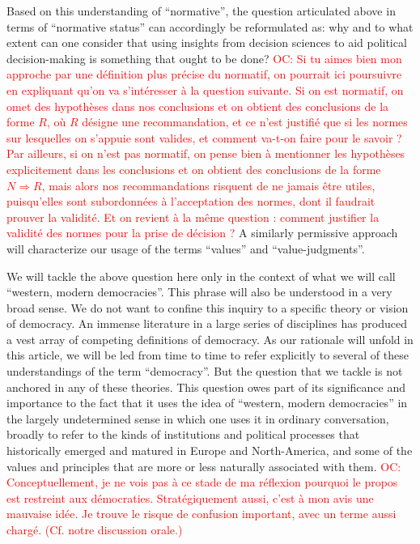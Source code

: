 \documentclass[preprint, french, english, 11pt]{elsarticle}%
\newcommand{\commentOC}[1]{\textcolor{red}{OC: #1}}
\begin{document}
Based on this understanding of ``normative'', the question articulated above in terms of ``normative status'' can accordingly be reformulated as: why and to what extent can one consider that using insights from decision sciences to aid political decision-making is something that ought to be done?
\commentOC{Si tu aimes bien mon approche par une définition plus précise du normatif, on pourrait ici poursuivre en expliquant qu’on va s’intéresser à la question suivante. Si on est normatif, on omet des hypothèses dans nos conclusions et on obtient des conclusions de la forme $R$, où $R$ désigne une recommandation, et ce n’est justifié que si les normes sur lesquelles on s’appuie sont valides, et comment va-t-on faire pour le savoir ? Par ailleurs, si on n’est pas normatif, on pense bien à mentionner les hypothèses explicitement dans les conclusions et on obtient des conclusions de la forme $N ⇒ R$, mais alors nos recommandations risquent de ne jamais être utiles, puisqu’elles sont subordonnées à l’acceptation des normes, dont il faudrait prouver la validité. Et on revient à la même question : comment justifier la validité des normes pour la prise de décision ?}
 A similarly permissive approach will characterize our usage of the terms ``values'' and ``value-judgments''.

We will tackle the above question here only in the context of what we will call ``western, modern democracies''. This phrase will also be understood in a very broad sense. We do not want to confine this inquiry to a specific theory or vision of democracy. An immense literature in a large series of disciplines has produced a vest array of competing definitions of democracy. As our rationale will unfold in this article, we will be led from time to time to refer explicitly to several of these understandings of the term ``democracy''. But the question that we tackle is not anchored in any of these theories. This question owes part of its significance and importance to the fact that it uses the idea of “western, modern democracies” in the largely undetermined sense in which one uses it in ordinary conversation, broadly to refer to the kinds of institutions and political processes that historically emerged and matured in Europe and North-America, and some of the values and principles that are more or less naturally associated with them.
\commentOC{Conceptuellement, je ne vois pas à ce stade de ma réflexion pourquoi le propos est restreint aux démocraties. Stratégiquement aussi, c’est à mon avis une mauvaise idée. Je trouve le risque de confusion important, avec un terme aussi chargé. (Cf. notre discussion orale.)}
\end{document}
